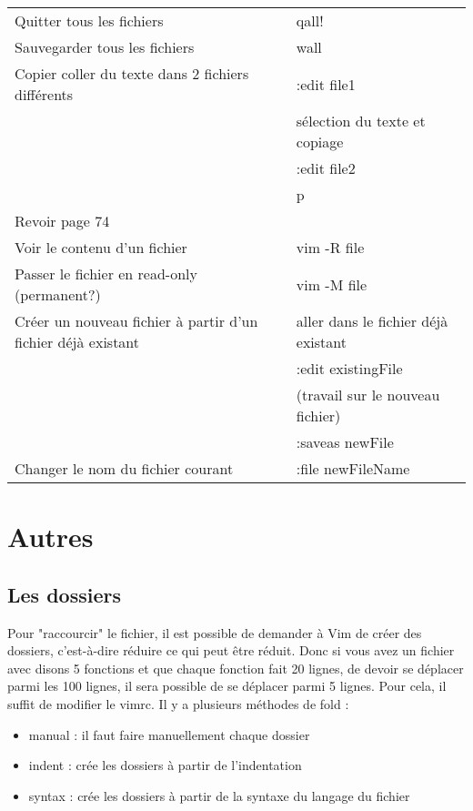 \documentclass{article}
\begin{document}
\begin{center}
\begin{tabular}{|l l|}
    \hline
    Quitter tous les fichiers & qall! \\
    Sauvegarder tous les fichiers & wall \\ 
    \hline
    Copier coller du texte dans 2 fichiers différents & :edit file1 \\
     & sélection du texte et copiage \\
     & :edit file2 \\
     & p \\
    \hline
    Revoir page 74 \\
    \hline
    Voir le contenu d'un fichier & vim -R file \\
    \hline
    Passer le fichier en read-only (permanent?) & vim -M file \\
    \hline
    Créer un nouveau fichier à partir d'un fichier déjà existant & aller dans le fichier déjà existant \\
     & :edit existingFile \\
     & (travail sur le nouveau fichier) \\
     & :saveas newFile \\
    \hline
    Changer le nom du fichier courant & :file newFileName \\
    \hline
\end{tabular}
\end{center}


\section{Autres}
\subsection{Les dossiers}
Pour "raccourcir" le fichier, il est possible de demander à Vim de créer des dossiers, c'est-à-dire réduire ce qui peut être réduit. Donc si vous avez un fichier avec disons 5 fonctions et que chaque fonction fait 20 lignes, de devoir se déplacer parmi les 100 lignes, il sera possible de se déplacer parmi 5 lignes. Pour cela, il suffit de modifier le vimrc.\newline
Il y a plusieurs méthodes de fold :
\begin{itemize}
    \item manual : il faut faire manuellement chaque dossier
    \item indent : crée les dossiers à partir de l'indentation
    \item syntax : crée les dossiers à partir de la syntaxe du langage du fichier
\end{itemize}
\end{document}
